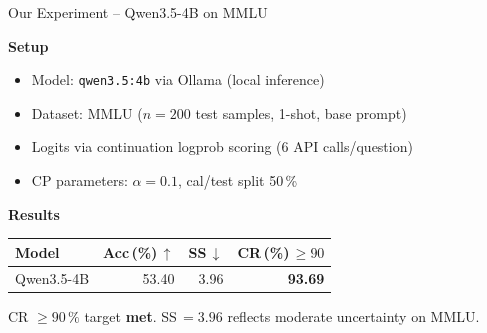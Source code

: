 \documentclass{beamer}
\newcommand{\grow}{\rowcolor{hlgreen}}
\begin{document}
\begin{frame}{Our Experiment -- Qwen3.5-4B on MMLU}

\begin{block}{\textbf{Setup}}
\small
\begin{itemize}\setlength\itemsep{3pt}
  \item Model: \texttt{qwen3.5:4b} via Ollama (local inference)
  \item Dataset: MMLU ($n=200$ test samples, 1-shot, base prompt)
  \item Logits via continuation logprob scoring (6 API calls/question)
  \item CP parameters: $\alpha=0.1$,\; cal/test split 50\,\%
\end{itemize}
\end{block}

\medskip

\begin{block}{\textbf{Results}}
\renewcommand{\arraystretch}{1.3}
\begin{center}
\begin{tabular}{lrrr}
\toprule
\textbf{Model} & \textbf{Acc\,(\%)\,$\uparrow$} & \textbf{SS\,$\downarrow$} & \textbf{CR\,(\%)\,$\geq90$} \\
\midrule
\grow Qwen3.5-4B & 53.40 & 3.96 & \textbf{93.69} \\
\bottomrule
\end{tabular}
\end{center}
\smallskip
CR $\geq 90\,\%$ target \textbf{met}.\quad
SS\,$=3.96$ reflects moderate uncertainty on MMLU.
\end{block}

\end{frame}
\end{document}

